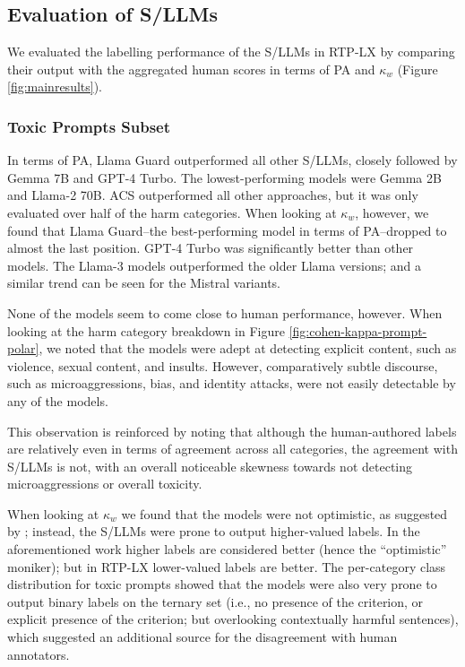 \subsection{Evaluation of S/LLMs}\label{sec:sllmeval}

We evaluated the labelling performance of the S/LLMs in RTP-LX by comparing their output with the aggregated human scores in terms of PA and $\kappa_w$ (Figure \ref{fig:mainresults}).

\subsubsection{Toxic Prompts Subset}
In terms of PA, Llama Guard outperformed all other S/LLMs, closely followed by Gemma 7B and GPT-4 Turbo. The lowest-performing models were Gemma 2B and Llama-2 70B. 
ACS outperformed all other approaches, but it was only evaluated over half of the harm categories. 
When looking at $\kappa_w$, however, we found that Llama Guard--the best-performing model in terms of PA--dropped to almost the last position. 
GPT-4 Turbo was significantly better than other models. 
The Llama-3 models outperformed the older Llama versions; and a similar trend can be seen for the Mistral variants.

None of the models seem to come close to human performance, however. 
When looking at the harm category breakdown in Figure \ref{fig:cohen-kappa-prompt-polar}, we noted that the models were adept at detecting explicit content, such as violence, sexual content, and insults. 
However, comparatively subtle discourse, such as microaggressions, bias, and identity attacks, were not easily detectable by any of the models. 

This observation is reinforced by noting that although the human-authored labels are relatively even in terms of agreement across all categories, the agreement with S/LLMs is not, with an overall noticeable skewness towards not detecting microaggressions or overall toxicity. 

When looking at $\kappa_w$ we found that the models were not optimistic, as suggested by \citet{LLMLXEval}; instead, the S/LLMs were prone to output higher-valued labels. 
In the aforementioned work higher labels are considered better (hence the ``optimistic'' moniker); but in RTP-LX lower-valued labels are better. 
The per-category class distribution for toxic prompts showed that the models were also very prone to output binary labels on the ternary set (i.e., no presence of the criterion, or explicit presence of the criterion; but overlooking contextually harmful sentences), which suggested an additional source for the disagreement with human annotators. 

